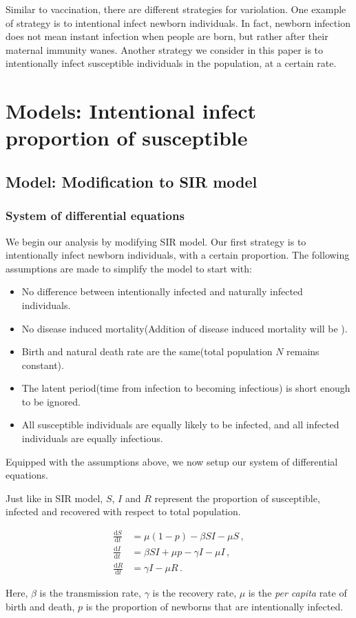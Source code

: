\documentclass[12pt]{article}
\newcommand\dbyd[2]{\frac{\mathrm d{#1}}{\mathrm d{#2}}}
\begin{document}
Similar to vaccination, there are different strategies for variolation. One example of strategy is to intentional infect newborn individuals. In fact, newborn infection does not mean instant infection when people are born, but rather after their maternal immunity wanes. Another strategy we consider in this paper is to intentionally infect susceptible individuals in the population, at a certain rate. 

\section{Models: Intentional infect proportion of susceptible}
\subsection{Model: Modification to SIR model}
\subsubsection{System of differential equations}
We begin our analysis by modifying SIR model. Our first strategy is to intentionally infect newborn individuals, with a certain proportion.  The following assumptions are made to simplify the model to start with:
\begin{itemize}
\item No difference between intentionally infected and naturally infected individuals.
\item No disease induced mortality(Addition of disease induced mortality will be ).
\item Birth and natural death rate are the same(total population $N$ remains constant).
\item The latent period(time from infection to becoming infectious) is short enough to be ignored.
\item All susceptible individuals are equally likely to be infected, and all infected individuals are equally infectious.
\end{itemize}
Equipped with the assumptions above, we now setup our system of differential equations.

Just like in SIR model, $S$, $I$ and $R$ represent the proportion of susceptible, infected and recovered with respect to total population.
\begin{linenomath*}
\begin{equation}\label{1}
\begin{split}
\dbyd{S}{t}&=\mu(1-p)- \beta SI-\mu S \,,\\
\dbyd{I}{t}&=\beta SI+\mu p-\gamma I -\mu I\,,\\
\dbyd{R}{t}&=\gamma I-\mu R\,.
\end{split}
\end{equation}
\end{linenomath*}
Here, $\beta$ is the transmission rate, $\gamma$ is the recovery rate,
$\mu$ is the \emph{per capita} rate of birth and death, $p$ is the
proportion of newborns that are intentionally infected.
\end{document}
